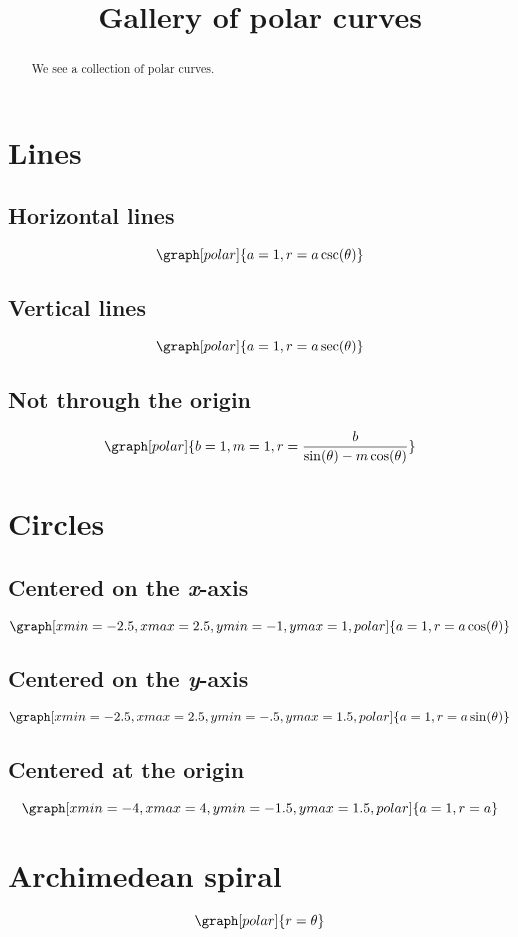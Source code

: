 \documentclass{ximera}
\title[Dig-In:]{Gallery of polar curves}
\begin{document}
\begin{abstract}
We see a collection of polar curves.
\end{abstract}
\maketitle

\section{Lines}

\subsection{Horizontal lines}
\[
\graph[polar]{a=1,r=a \csc(\theta)}
\]
\subsection{Vertical lines}
\[
\graph[polar]{a=1,r=a \sec(\theta)}
\]
\subsection{Not through the origin}
\[
\graph[polar]{b=1,m=1,r=\frac{b}{\sin(\theta)-m \cos(\theta)}}
\]

\section{Circles}

\subsection{Centered on the \textit{x}-axis}
\[
\graph[xmin=-2.5,xmax=2.5,ymin=-1,ymax=1,polar]{a=1, r=a \cos(\theta)}
\]

\subsection{Centered on the \textit{y}-axis}
\[
\graph[xmin=-2.5,xmax=2.5,ymin=-.5,ymax=1.5,polar]{a=1,r=a \sin(\theta)}
\]

\subsection{Centered at the origin}
\[
\graph[xmin=-4,xmax=4,ymin=-1.5,ymax=1.5,polar]{a=1,r=a}
\]

\section{Archimedean spiral}
\[
\graph[polar]{r=\theta}
\]
\end{document}
